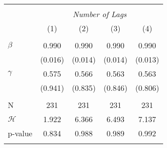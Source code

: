 \begin{tabular}{@{\extracolsep{5pt}}lcccc} 
\\[-1.8ex]\hline 
\hline \\[-1.8ex] 
& \multicolumn{4}{c}{\textit{Number of Lags}} \\ 
& (1) & (2) & (3) & (4) \\ 
\hline \\[-1.8ex] 
$\beta$ & 0.990& 0.990& 0.990& 0.990\\ 
& (0.016)& (0.014)& (0.014)& (0.013)\\ 
$\gamma$ & 0.575& 0.566& 0.563& 0.563\\ 
& (0.941)& (0.835)& (0.846)& (0.806)\\ 
\hline \\[-1.8ex] 
N & 231 & 231 & 231 & 231\\ 
 $\mathcal H$ & 1.922 & 6.366 & 6.493 & 7.137\\ 
 p-value & 0.834 & 0.988 & 0.989 & 0.992 \\ 
\hline \hline \\[-1.8ex] 
\end{tabular}